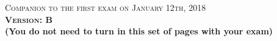 \documentclass{docist}
\begin{document}
\thispagestyle{empty}

\begin{center}
  {\Large \textsc{Companion to the first exam on January 12th, 2018\\[2ex]
  \textbf{Version: B}\\[2ex]}}
  {\normalsize  \textbf{(You do not need to turn in this set of pages with your exam)}}
\end{center}





\qComponentAndConnectorViewtypeOne



\qPublishsubscribeOne



\qGraphiteOne



\qProxyServer



\qFenixOne



\qAvailabilityOne



\qPerformanceOne



\qModifiabilityExamOne



\qModuleViewtypeExamOne



\qDecompositionGeneralization



\qAggregateOne



\qMicroservicesExamOne


\qDVDOne



\qAdventureBuilderOne



\qPulseOne



\qOrderPadOne



\qLayered


\qDynamicReconfiguration



\qDeployment



\qWebAppsOne
\end{document}
